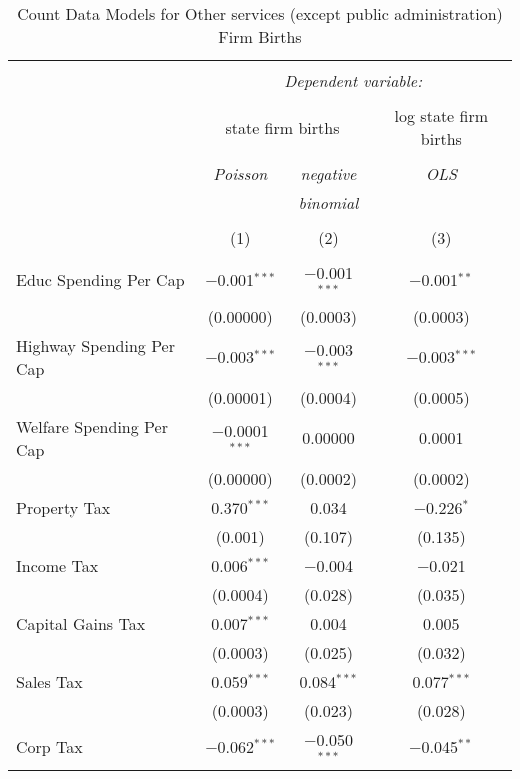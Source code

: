 
\begin{table}[!htbp] \centering 
  \caption{Count Data Models for Other services (except public administration) Firm Births} 
  \label{} 
\begin{tabular}{@{\extracolsep{5pt}}lccc} 
\\[-1.8ex]\hline 
\hline \\[-1.8ex] 
 & \multicolumn{3}{c}{\textit{Dependent variable:}} \\ 
\cline{2-4} 
\\[-1.8ex] & \multicolumn{2}{c}{state firm births} & log state firm births \\ 
\\[-1.8ex] & \textit{Poisson} & \textit{negative} & \textit{OLS} \\ 
 & \textit{} & \textit{binomial} & \textit{} \\ 
\\[-1.8ex] & (1) & (2) & (3)\\ 
\hline \\[-1.8ex] 
 Educ Spending Per Cap & $-$0.001$^{***}$ & $-$0.001$^{***}$ & $-$0.001$^{**}$ \\ 
  & (0.00000) & (0.0003) & (0.0003) \\ 
  Highway Spending Per Cap  & $-$0.003$^{***}$ & $-$0.003$^{***}$ & $-$0.003$^{***}$ \\ 
  & (0.00001) & (0.0004) & (0.0005) \\ 
  Welfare Spending Per Cap  & $-$0.0001$^{***}$ & 0.00000 & 0.0001 \\ 
  & (0.00000) & (0.0002) & (0.0002) \\ 
  Property Tax & 0.370$^{***}$ & 0.034 & $-$0.226$^{*}$ \\ 
  & (0.001) & (0.107) & (0.135) \\ 
  Income Tax & 0.006$^{***}$ & $-$0.004 & $-$0.021 \\ 
  & (0.0004) & (0.028) & (0.035) \\ 
  Capital Gains Tax & 0.007$^{***}$ & 0.004 & 0.005 \\ 
  & (0.0003) & (0.025) & (0.032) \\ 
  Sales Tax & 0.059$^{***}$ & 0.084$^{***}$ & 0.077$^{***}$ \\ 
  & (0.0003) & (0.023) & (0.028) \\ 
  Corp Tax & $-$0.062$^{***}$ & $-$0.050$^{***}$ & $-$0.045$^{**}$ \\ 

\end{tabular}
\end{table}
